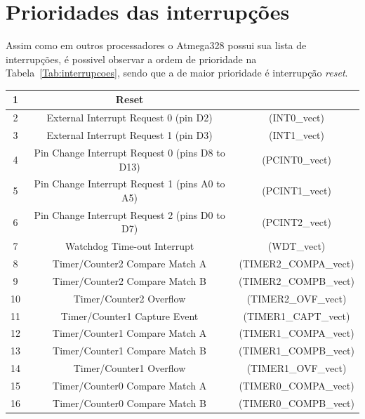 \documentclass[a4paper,12pt,portuguese]{ufms-cpcx}
\begin{document}
\section{Prioridades das interrupções}\label{interrupcao328}
Assim como em outros processadores o Atmega328 possui sua lista de interrupções, é possivel observar a ordem de prioridade na Tabela~\ref{Tab:interrupcoes}, sendo que a de maior prioridade é interrupção \textit{reset}.

\begin{table}[!h]
	\renewcommand{\arraystretch}{1.3}
	\centering
	\begin{tabular}{|c|cc|}
		\hline
		1  &                      Reset                      &  \\ \hline
		2  &     External Interrupt Request 0  (pin D2)      &     (INT0\_vect)     \\ \hline
		3  &     External Interrupt Request 1  (pin D3)      &     (INT1\_vect)     \\ \hline
		4  & Pin Change Interrupt Request 0 (pins D8 to D13) &    (PCINT0\_vect)    \\ \hline
		5  & Pin Change Interrupt Request 1 (pins A0 to A5)  &    (PCINT1\_vect)    \\ \hline
		6  & Pin Change Interrupt Request 2 (pins D0 to D7)  &    (PCINT2\_vect)    \\ \hline
		7  &           Watchdog Time-out Interrupt           &     (WDT\_vect)      \\ \hline
		8  &         Timer/Counter2 Compare Match A          & (TIMER2\_COMPA\_vect) \\ \hline
		9  &         Timer/Counter2 Compare Match B          & (TIMER2\_COMPB\_vect) \\ \hline
		10 &             Timer/Counter2 Overflow             &  (TIMER2\_OVF\_vect)  \\ \hline
		11 &          Timer/Counter1 Capture Event           & (TIMER1\_CAPT\_vect)  \\ \hline
		12 &         Timer/Counter1 Compare Match A          & (TIMER1\_COMPA\_vect) \\ \hline
		13 &         Timer/Counter1 Compare Match B          & (TIMER1\_COMPB\_vect) \\ \hline
		14 &             Timer/Counter1 Overflow             &  (TIMER1\_OVF\_vect)  \\ \hline
		15 &         Timer/Counter0 Compare Match A          & (TIMER0\_COMPA\_vect) \\ \hline
		16 &         Timer/Counter0 Compare Match B          & (TIMER0\_COMPB\_vect) \\ \hline

\end{tabular}
\end{table}
\end{document}
